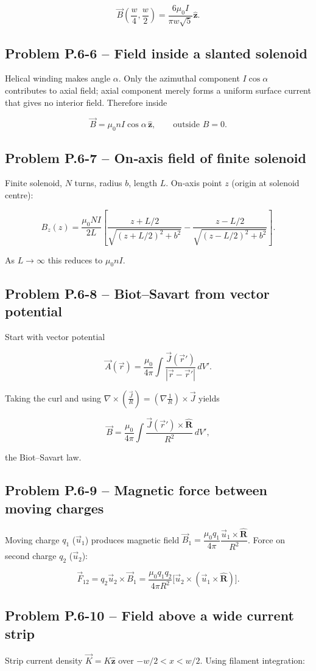 \documentclass[12pt]{article}
\begin{document}
\[
\vec B\!\left(\frac{w}{4},\frac{w}{2}\right)=\frac{6\mu_0 I}{\pi w\sqrt{5}}\hat{\mathbf z}.
\]
\n\bigskip\n\subsection*{Problem P.6-6 – Field inside a slanted solenoid}\n
Helical winding makes angle \(\alpha\).  Only the azimuthal component \(I\cos\alpha\) contributes to axial field; axial component merely forms a uniform surface current that gives no interior field.  Therefore inside

\[
\vec B=\mu_0 n I\cos\alpha\,\hat{\mathbf z},\qquad \text{outside } B=0.
\]
\n\bigskip\n\subsection*{Problem P.6-7 – On‑axis field of finite solenoid}\n
Finite solenoid, \(N\) turns, radius \(b\), length \(L\).  On‑axis point \(z\) (origin at solenoid centre):

\[
B_z(z)=\frac{\mu_0 N I}{2L}\left[\frac{z+L/2}{\sqrt{(z+L/2)^2+b^{2}}}-\frac{z-L/2}{\sqrt{(z-L/2)^2+b^{2}}}\right].
\]

As \(L\to\infty\) this reduces to \(\mu_0 n I\).
\n\bigskip\n\subsection*{Problem P.6-8 – Biot–Savart from vector potential}\n
Start with vector potential

\[
\vec A(\vec r)=\frac{\mu_0}{4\pi}\int\frac{\vec J(\vec r')}{|\vec r-\vec r'|}\,dV'.
\]

Taking the curl and using \(\nabla\times(\frac{\vec J}{R})=(\nabla\frac1R)\times\vec J\) yields

\[
\vec B=\frac{\mu_0}{4\pi}\int\frac{\vec J(\vec r')\times\hat{\mathbf R}}{R^{2}}\,dV',
\]

the Biot–Savart law.
\n\bigskip\n\subsection*{Problem P.6-9 – Magnetic force between moving charges}\n
Moving charge \(q_1\) (\(\vec u_1\)) produces magnetic field \(\vec B_1=\dfrac{\mu_0 q_1}{4\pi}\dfrac{\vec u_1\times\hat{\mathbf R}}{R^{2}}\).  Force on second charge \(q_2\) (\(\vec u_2\)):

\[
\vec F_{12}=q_2\vec u_2\times\vec B_1
           =\frac{\mu_0 q_1 q_2}{4\pi R^{2}}\bigl[\vec u_2\times(\vec u_1\times\hat{\mathbf R})\bigr].
\]
\n\bigskip\n\subsection*{Problem P.6-10 – Field above a wide current strip}\n
Strip current density \(\vec K=K\hat{\mathbf z}\) over \(-w/2<x<w/2\).  Using filament integration:
\end{document}
